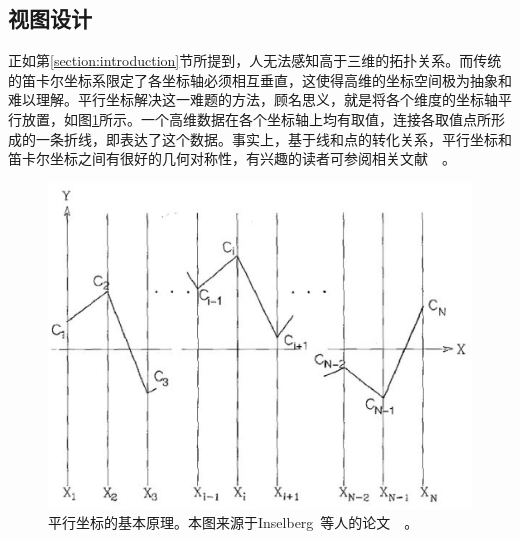 \documentclass[12pt,twocolumn]{article}
\begin{document}
                                                                                                                                                                                                                                                                                                                                                                                                                                                                                                                                                                                                                                                                                                                                                                                                                                                                                                                                                                                                                                                                                                                                                                                                                                                                                              

\subsection{视图设计}
\label{subsection:designBasics}
正如第\ref{section:introduction}节所提到，人无法感知高于三维的拓扑关系。而传统的笛卡尔坐标系限定了各坐标轴必须相互垂直，这使得高维的坐标空间极为抽象和难以理解。平行坐标解决这一难题的方法，顾名思义，就是将各个维度的坐标轴平行放置，如图\ref{fig:PC_principle}所示。一个高维数据在各个坐标轴上均有取值，连接各取值点所形成的一条折线，即表达了这个数据。事实上，基于线和点的转化关系，平行坐标和笛卡尔坐标之间有很好的几何对称性，有兴趣的读者可参阅相关文献~\citep{inselberg1985plane}~\citep{inselberg2009parallel}。

\begin{figure}[!htb]
\centering
\includegraphics[width=1.0\linewidth]{images/PC_principle.eps}
\caption{\label{fig:PC_principle}平行坐标的基本原理。本图来源于Inselberg~等人的论文~\citep{inselberg1985plane}~。
}
\end{figure}
\end{document}
